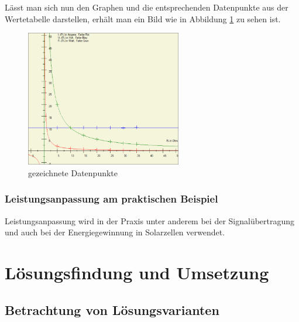 \documentclass[a4paper]{article}
\begin{document}
    Lässt man sich nun den Graphen und die entsprechenden Datenpunkte aus der Wertetabelle darstellen, erhält man ein Bild wie in Abbildung \ref{fig:graphbefuellt} zu sehen ist.
    \begin{figure}[!h]
        \begin{center}
            \includegraphics[width=6.8cm]{img/graphbefuellt}
            \caption{gezeichnete Datenpunkte}
            \label{fig:graphbefuellt}
        \end{center}
    \end{figure}

    \subsubsection{Leistungsanpassung am praktischen Beispiel}
    
    Leistungsanpassung wird in der Praxis unter anderem bei der Signalübertragung und auch bei der Energiegewinnung in Solarzellen verwendet.

\newpage
\section{Lösungsfindung und Umsetzung}

\subsection{Betrachtung von Lösungsvarianten}
\end{document}
